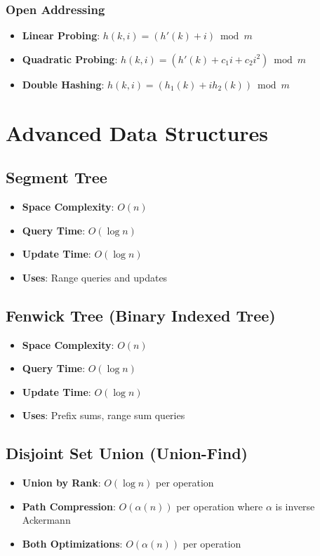 \documentclass[11pt]{article}
\theoremstyle{definition}
\begin{document}
\subsubsection{Open Addressing}
\begin{itemize}
    \item \textbf{Linear Probing}: $h(k,i) = (h'(k) + i) \bmod m$
    \item \textbf{Quadratic Probing}: $h(k,i) = (h'(k) + c_1i + c_2i^2) \bmod m$
    \item \textbf{Double Hashing}: $h(k,i) = (h_1(k) + ih_2(k)) \bmod m$
\end{itemize}

\section{Advanced Data Structures}

\subsection{Segment Tree}
\begin{itemize}
    \item \textbf{Space Complexity}: $O(n)$
    \item \textbf{Query Time}: $O(\log n)$
    \item \textbf{Update Time}: $O(\log n)$
    \item \textbf{Uses}: Range queries and updates
\end{itemize}

\subsection{Fenwick Tree (Binary Indexed Tree)}
\begin{itemize}
    \item \textbf{Space Complexity}: $O(n)$
    \item \textbf{Query Time}: $O(\log n)$
    \item \textbf{Update Time}: $O(\log n)$
    \item \textbf{Uses}: Prefix sums, range sum queries
\end{itemize}

\subsection{Disjoint Set Union (Union-Find)}
\begin{itemize}
    \item \textbf{Union by Rank}: $O(\log n)$ per operation
    \item \textbf{Path Compression}: $O(\alpha(n))$ per operation where $\alpha$ is inverse Ackermann
    \item \textbf{Both Optimizations}: $O(\alpha(n))$ per operation
\end{itemize}
\end{document}
